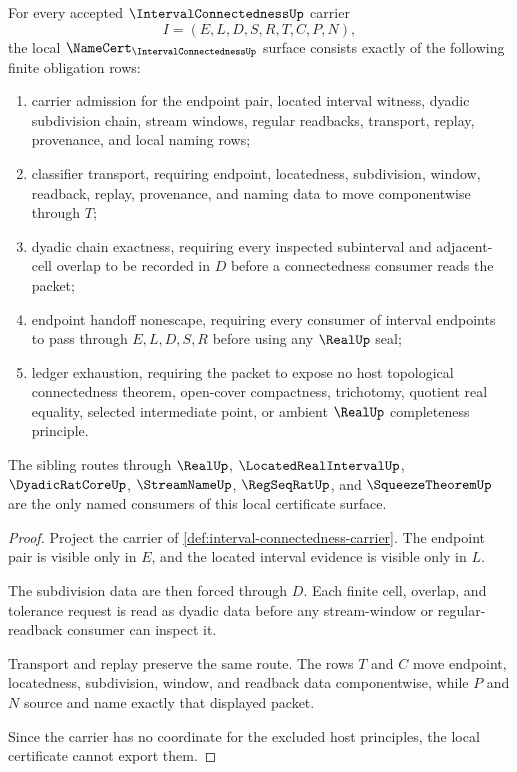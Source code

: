 \begin{theorem}
\label{thm:interval-connectedness-namecert-obligations}
For every accepted $\IntervalConnectednessUp$ carrier
$$
I=(E,L,D,S,R,T,C,P,N),
$$
the local $\NameCert_{\IntervalConnectednessUp}$ surface consists exactly of the following finite obligation rows:
\begin{enumerate}
\item carrier admission for the endpoint pair, located interval witness, dyadic subdivision chain, stream windows, regular readbacks, transport, replay, provenance, and local naming rows;
\item classifier transport, requiring endpoint, locatedness, subdivision, window, readback, replay, provenance, and naming data to move componentwise through $T$;
\item dyadic chain exactness, requiring every inspected subinterval and adjacent-cell overlap to be recorded in $D$ before a connectedness consumer reads the packet;
\item endpoint handoff nonescape, requiring every consumer of interval endpoints to pass through $E,L,D,S,R$ before using any $\RealUp$ seal;
\item ledger exhaustion, requiring the packet to expose no host topological connectedness theorem, open-cover compactness, trichotomy, quotient real equality, selected intermediate point, or ambient $\RealUp$ completeness principle.
\end{enumerate}
The sibling routes through $\RealUp$, $\LocatedRealIntervalUp$, $\DyadicRatCoreUp$, $\StreamNameUp$, $\RegSeqRatUp$, and $\SqueezeTheoremUp$ are the only named consumers of this local certificate surface.
\end{theorem}
\begin{proof}
Project the carrier of \autoref{def:interval-connectedness-carrier}. The endpoint pair is visible only in $E$, and the located interval evidence is visible only in $L$.

The subdivision data are then forced through $D$. Each finite cell, overlap, and tolerance request is read as dyadic data before any stream-window or regular-readback consumer can inspect it.

Transport and replay preserve the same route. The rows $T$ and $C$ move endpoint, locatedness, subdivision, window, and readback data componentwise, while $P$ and $N$ source and name exactly that displayed packet.

Since the carrier has no coordinate for the excluded host principles, the local certificate cannot export them.
\end{proof}

